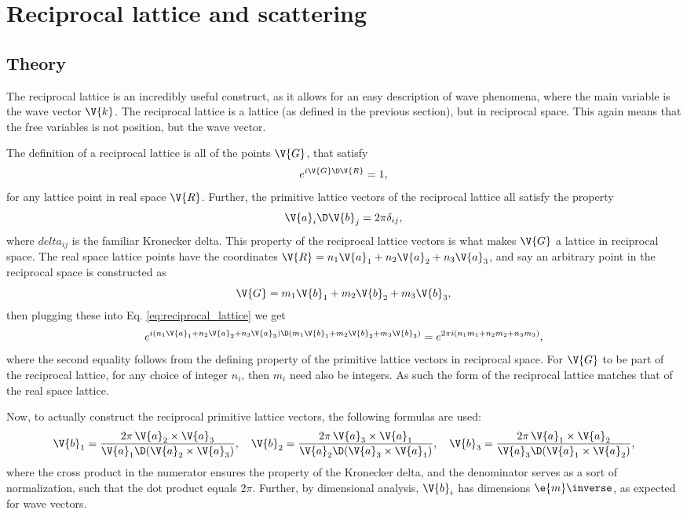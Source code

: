 \documentclass[main.tex]{subfiles}
\begin{document}
	\section{Reciprocal lattice and scattering}
	\subsection{Theory}
	The reciprocal lattice is an incredibly useful construct, as it allows for an easy description of wave phenomena, where the main variable is the wave vector $ \V{k} $. The reciprocal lattice is a lattice (as defined in the previous section), but in reciprocal space. This again means that the free variables is not position, but the wave vector.
	
	The definition of a reciprocal lattice is all of the points $ \V{G} $, that satisfy
	\begin{equation}\label{eq:reciprocal_lattice}
		e^{i \V{G} \D \V{R}} = 1,
	\end{equation}
	for any lattice point in real space $ \V{R} $. Further, the primitive lattice vectors of the reciprocal lattice all satisfy the property
	\begin{equation}\label{eq:rec_prim_def}
		\V{a}_i \D \V{b}_j = 2\pi \delta_{ij},
	\end{equation}
	where $ delta_{ij} $ is the familiar Kronecker delta. This property of the reciprocal lattice vectors is what makes $ \V{G} $ a lattice in reciprocal space. The real space lattice points have the coordinates $ \V{R} = n_1 \V{a}_1 + n_2 \V{a}_2 + n_3 \V{a}_3 $, and say an arbitrary point in the reciprocal space is constructed as
	\begin{equation}\label{eq:rec_lat_vec}
		\V{G} = m_1 \V{b}_1 + m_2 \V{b}_2 + m_3 \V{b}_3,
	\end{equation}
	then plugging these into Eq. \eqref{eq:reciprocal_lattice} we get
	\begin{equation}
		e^{i (n_1 \V{a}_1 + n_2 \V{a}_2 + n_3 \V{a}_3) \D (m_1 \V{b}_1 + m_2 \V{b}_2 + m_3 \V{b}_3)} = e^{2\pi i (n_1 m_1 + n_2 m_2 + n_3 m_3)},
	\end{equation}
	where the second equality follows from the defining property of the primitive lattice vectors in reciprocal space. For $ \V{G} $ to be part of the reciprocal lattice, for any choice of integer $ n_i $, then $ m_i $ need also be integers. As such the form of the reciprocal lattice matches that of the real space lattice.
	
	Now, to actually construct the reciprocal primitive lattice vectors, the following formulas are used:
	\begin{equation}\label{eq:rec_prim_vec}
		\V{b}_1 = \frac{2\pi \, \V{a}_2 \times \V{a}_3}{\V{a}_1 \D (\V{a}_2 \times \V{a}_3)}, \quad \V{b}_2 = \frac{2\pi \, \V{a}_3 \times \V{a}_1}{\V{a}_2 \D (\V{a}_3 \times \V{a}_1)}, \quad \V{b}_3 = \frac{2\pi \, \V{a}_1 \times \V{a}_2}{\V{a}_3 \D (\V{a}_1 \times \V{a}_2)},
	\end{equation}
	where the cross product in the numerator ensures the property of the Kronecker delta, and the denominator serves as a sort of normalization, such that the dot product equals 2$ \pi $. Further, by dimensional analysis, $ \V{b}_i $ has dimensions $ \e{m}\inverse $, as expected for wave vectors.
	
\end{document}

